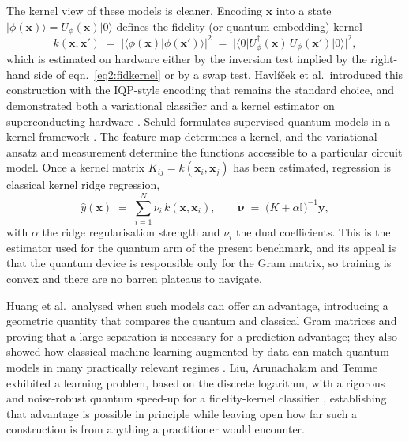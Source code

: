 \documentclass[Thesis.tex]{subfiles}
\begin{document}
The kernel view of these models is cleaner. Encoding $\mathbf{x}$ into a state
$\lvert \phi(\mathbf{x})\rangle = U_{\phi}(\mathbf{x})\lvert 0\rangle$ defines
the fidelity (or quantum embedding) kernel
\begin{equation}
  k(\mathbf{x},\mathbf{x}') \;=\; \bigl\lvert \langle \phi(\mathbf{x}) \vert \phi(\mathbf{x}')\rangle \bigr\rvert^{2}
  \;=\; \bigl\lvert \langle 0 \rvert U_{\phi}^{\dagger}(\mathbf{x})\,U_{\phi}(\mathbf{x}')\lvert 0\rangle \bigr\rvert^{2},
  \label{eq2:fidkernel}
\end{equation}
which is estimated on hardware either by the inversion test implied by the
right-hand side of eqn.~\eqref{eq2:fidkernel} or by a swap test. Havl\'i\v{c}ek
et al.\ introduced this construction with the IQP-style encoding that remains
the standard choice, and demonstrated both a variational classifier and a
kernel estimator on superconducting hardware \cite{havlicek2019supervised}.
Schuld formulates supervised quantum models in a kernel framework
\cite{schuld2021kernel}. The feature map determines a kernel, and the
variational ansatz and measurement determine the functions accessible to a
particular circuit model. Once a kernel matrix
$K_{ij} = k(\mathbf{x}_{i},\mathbf{x}_{j})$ has been estimated, regression is
classical kernel ridge regression,
\begin{equation}
  \widehat{y}(\mathbf{x}) \;=\; \sum_{i=1}^{N} \nu_{i}\, k(\mathbf{x},\mathbf{x}_{i}),
  \qquad
  \boldsymbol{\nu} \;=\; \bigl(K + \alpha \mathbb{I}\bigr)^{-1}\mathbf{y},
  \label{eq2:krr}
\end{equation}
with $\alpha$ the ridge regularisation strength and $\nu_{i}$ the dual
coefficients. This is the estimator used for the quantum arm
of the present benchmark, and its appeal is that the quantum device is
responsible only for the Gram matrix, so training is convex and there are no
barren plateaus to navigate.

Huang et al.\ analysed when such models can offer an advantage, introducing a
geometric quantity that compares the quantum and classical Gram matrices and
proving that a large separation is necessary for a prediction advantage; they
also showed how classical machine learning augmented by data can match quantum
models in many practically relevant regimes \cite{huang2021power}. Liu,
Arunachalam and Temme exhibited a learning problem, based on the discrete
logarithm, with a rigorous and noise-robust quantum speed-up for a
fidelity-kernel classifier \cite{liu2021rigorous}, establishing that advantage
is possible in principle while leaving open how far such a construction is
from anything a practitioner would encounter.
\end{document}
